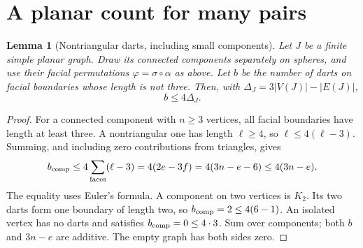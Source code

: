 \documentclass[11pt,a4paper]{article}
\newtheorem{lemma}[lemma]{Lemma}
\theoremstyle{definition}
\theoremstyle{remark}
\begin{document}
\section{A planar count for many pairs}
\label{sec:faces}

\begin{lemma}[Nontriangular darts, including small components]
\label{geom:nontriangular-darts}
Let $J$ be a finite simple planar graph. Draw its connected components
separately on spheres, and use their facial permutations
$\varphi=\sigma\circ\alpha$ as above. Let $b$ be the number of darts on
facial boundaries whose length is not three. Then, with
$\Delta_J=3|V(J)|-|E(J)|$,
\begin{equation}\label{geom:bad-dart-bound}
 b\leq4\Delta_J.
\end{equation}
\end{lemma}
\begin{proof}
For a connected component with $n\geq3$ vertices, all facial boundaries
have length at least three. A nontriangular one has length $\ell\geq4$,
so $\ell\leq4(\ell-3)$. Summing, and including zero contributions from
triangles, gives
\[
 b_{\rm comp}
 \leq4\sum_{\rm faces}(\ell-3)
 =4(2e-3f)=4(3n-e-6)\leq4(3n-e).
\]
The equality uses Euler's formula. A component on two vertices is $K_2$.
Its two darts form one boundary of length two, so
$b_{\rm comp}=2\leq4(6-1)$. An isolated vertex has no darts and satisfies
$b_{\rm comp}=0\leq4\cdot3$. Sum over components; both $b$ and $3n-e$
are additive. The empty graph has both sides zero.
\end{proof}
\end{document}
